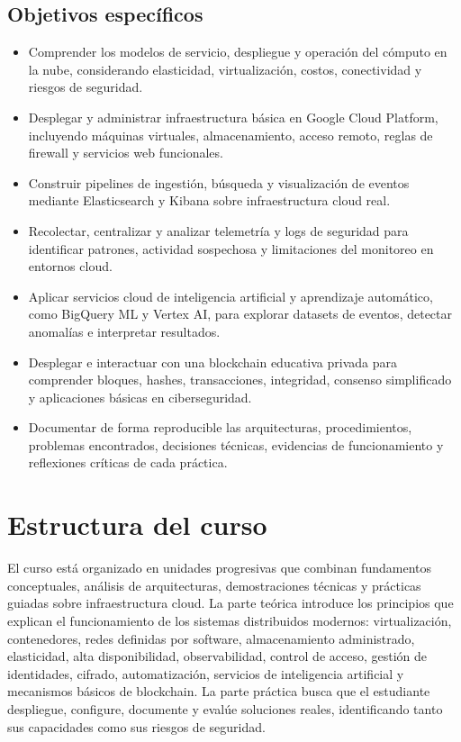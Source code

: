 \documentclass[
  coursetitle={Cómputo Nube y Tecnologías Emergentes},
  coursehours={96},
  coursedate={Verano 2026},
  doctype={Guía del curso},
  otherlangs={english,french},
  authorname={Lázaro},
  authorsurname={Bustio-Martínez},
  authortitle={PhD},
  role={Profesor Investigador},
  email={lbustio@inaoe.mx},
  phone={5559504000},
  ext={7459},
  institution={Instituto Nacional de Astrofísica, Óptica y Electrónica (INAOE)},
  department={Maestría en Ciencias en Tecnologías de Seguridad},
  address={Luis Enrique Erro 1, Sta. Ma. Tonantzintla, San Andrés Cholula, CP 72840, Puebla, México},
  margin={0.5in}
]{lbustio_lecture_notes}
\begin{document}
\subsection{Objetivos específicos}
\label{sec:objetivos_especificos}
\begin{itemize}
  \item Comprender los modelos de servicio, despliegue y operación del cómputo en la nube, considerando elasticidad, virtualización, costos, conectividad y riesgos de seguridad.
  \item Desplegar y administrar infraestructura básica en Google Cloud Platform, incluyendo máquinas virtuales, almacenamiento, acceso remoto, reglas de firewall y servicios web funcionales.
  \item Construir pipelines de ingestión, búsqueda y visualización de eventos mediante Elasticsearch y Kibana sobre infraestructura cloud real.
  \item Recolectar, centralizar y analizar telemetría y logs de seguridad para identificar patrones, actividad sospechosa y limitaciones del monitoreo en entornos cloud.
  \item Aplicar servicios cloud de inteligencia artificial y aprendizaje automático, como BigQuery ML y Vertex AI, para explorar datasets de eventos, detectar anomalías e interpretar resultados.
  \item Desplegar e interactuar con una blockchain educativa privada para comprender bloques, hashes, transacciones, integridad, consenso simplificado y aplicaciones básicas en ciberseguridad.
  \item Documentar de forma reproducible las arquitecturas, procedimientos, problemas encontrados, decisiones técnicas, evidencias de funcionamiento y reflexiones críticas de cada práctica.
\end{itemize}

\section{Estructura del curso}
\label{sec:estrucrtura}
El curso está organizado en unidades progresivas que combinan fundamentos conceptuales, análisis de arquitecturas, demostraciones técnicas y prácticas guiadas sobre infraestructura cloud. La parte teórica introduce los principios que explican el funcionamiento de los sistemas distribuidos modernos: virtualización, contenedores, redes definidas por software, almacenamiento administrado, elasticidad, alta disponibilidad, observabilidad, control de acceso, gestión de identidades, cifrado, automatización, servicios de inteligencia artificial y mecanismos básicos de blockchain. La parte práctica busca que el estudiante despliegue, configure, documente y evalúe soluciones reales, identificando tanto sus capacidades como sus riesgos de seguridad.
\end{document}

